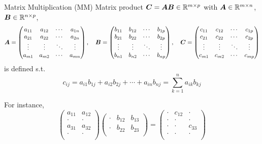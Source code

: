 \begin{frame}{Matrix Multiplication (MM)}
    Matrix product $\bm{C} = \bm{A}\bm{B} \in \mathbb{R}^{m \times p}$ with $\bm{A} \in \mathbb{R}^{m \times n}$,
    $\bm{B} \in \mathbb{R}^{n \times p}$,
    $$\bm{A}=\begin{pmatrix}
            a_{11} & a_{12} & \cdots & a_{1n} \\
            a_{21} & a_{22} & \cdots & a_{2n} \\
            \vdots & \vdots & \ddots & \vdots \\
            a_{m1} & a_{m2} & \cdots & a_{mn} \\
        \end{pmatrix},\quad\bm{B}=\begin{pmatrix}
            b_{11} & b_{12} & \cdots & b_{1p} \\
            b_{21} & b_{22} & \cdots & b_{2p} \\
            \vdots & \vdots & \ddots & \vdots \\
            b_{n1} & b_{n2} & \cdots & b_{np} \\
        \end{pmatrix},\quad\bm{C}=\begin{pmatrix}
            c_{11} & c_{12} & \cdots & c_{1p} \\
            c_{21} & c_{22} & \cdots & c_{2p} \\
            \vdots & \vdots & \ddots & \vdots \\
            c_{m1} & c_{m2} & \cdots & c_{mp} \\
        \end{pmatrix}
    $$
    is defined s.t.
    $$c_{ij} = a_{i1}b_{1j} + a_{i2}b_{2j} +\cdots + a_{in}b_{nj}= \sum_{k=1}^n a_{ik}b_{kj}$$

    For instance,
    $$
        \begin{pmatrix}
            a_{11} & a_{12} \\
            \cdot  & \cdot  \\
            a_{31} & a_{32} \\
            \cdot  & \cdot  \\
        \end{pmatrix}
        \begin{pmatrix}
            \cdot & b_{12} & b_{13} \\
            \cdot & b_{22} & b_{23} \\
        \end{pmatrix}
        = \begin{pmatrix}
            \cdot & c_{12} & \cdot  \\
            \cdot & \cdot  & \cdot  \\
            \cdot & \cdot  & c_{33} \\
            \cdot & \cdot  & \cdot  \\
        \end{pmatrix}
    $$
\end{frame}

